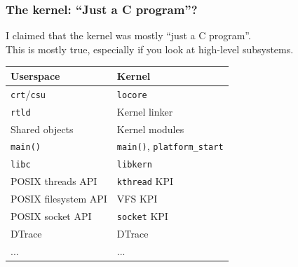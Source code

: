\begin{frame}
  \frametitle{The kernel: ``Just a C program''?}

    I claimed that the kernel was mostly ``just a C program''. \\
    This is mostly true, especially if you look at high-level subsystems.

  \begin{center}
    \begin{tabular}{ll}
    \hline
      \textbf{Userspace} & \textbf{Kernel}\\
    \hline
      \texttt{crt}/\texttt{csu} & \texttt{locore} \\
      \texttt{rtld} & Kernel linker \\
      Shared objects & Kernel modules \\
      \texttt{main()} & \texttt{main()}, \texttt{platform\_start} \\
      \texttt{libc} & \texttt{libkern} \\
      POSIX threads API & \texttt{kthread} KPI \\
      POSIX filesystem API & VFS KPI \\
      POSIX socket API & \texttt{socket} KPI \\
      DTrace & DTrace \\
      ... & ... \\
      \hline
    \end{tabular}
  \end{center}

\end{frame}


